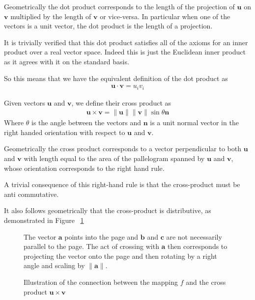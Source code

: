 \documentclass[]{article}
\begin{document}
Geometrically the dot product corresponds to the length of the projection of $\mathbf{u}$ on $\mathbf{v}$ multiplied by the length of $\mathbf{v}$ or vice-versa. In particular when one of the vectors is a unit vector, the dot product is the length of a projection.

It is trivially verified that this dot product satisfies all of the axioms for an inner product over a real vector space. Indeed this is just the Euclidean inner product as it agrees with it on the standard basis.

So this means that we have the equivalent definition of the dot product as 
\begin{align*}
		\mathbf{u} \cdot \mathbf{v} = u_i v_i
\end{align*}

\begin{defi} 
	Given vectors $\mathbf{u}$ and $\mathbf{v}$, we define their cross product as 
	\begin{align*}
			\mathbf{u} \times \mathbf{v} = \|\mathbf{u}\| \|\mathbf{v}\| \sin\theta \mathbf{n}
	\end{align*}
	Where $\theta$ is the angle between the vectors and $\mathbf{n}$ is a unit normal vector in the right handed orientation with respect to $\mathbf{u}$ and $\mathbf{v}$.
\end{defi}

Geometrically the cross product corresponds to a vector perpendicular to both $\mathbf{u}$ and $\mathbf{v}$ with length equal to the area of the pallelogram spanned by $\mathbf{u}$ and $\mathbf{v}$, whose orientation corresponds to the right hand rule.

A trivial consequence of this right-hand rule is that the cross-product must be anti commutative.

It also follows geometrically that the cross-product is distributive, as demonstrated in Figure ~\ref{fig:distributive-cross-product}

\begin{figure}[ht]
\centering
{}
\caption{The vector $\mathbf{a}$ points into the page and $\mathbf{b}$ and $\mathbf{c}$ are not necessarily parallel to the page. The act of crossing with $\mathbf{a}$ then corresponds to projecting the vector onto the page and then rotating by a right angle and scaling by  $\|\mathbf{a}\|$. }
\label{fig:distributive-cross-product}
\end{figure}

\begin{figure}[ht]
\centering
{}
\caption{Illustration of the connection between the mapping $f$ and the cross product $\mathbf{u} \times \mathbf{v}$}
\label{fig:cross-product-determinant}
\end{figure}
\end{document}
